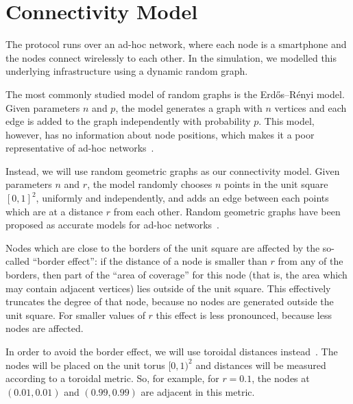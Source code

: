 \section{Connectivity Model}

The protocol runs over an ad-hoc network,
where each node is a smartphone
and the nodes connect wirelessly to each other.
In the simulation,
we modelled this underlying infrastructure using a dynamic random graph.

The most commonly studied model of random graphs is the Erdős--Rényi model.
Given parameters $n$ and $p$,
the model generates a graph with $n$ vertices
and each edge is added to the graph independently with probability $p$.
This model, however,
has no information about node positions,
which makes it a poor representative of ad-hoc networks~\cite{Hekmat2006}.

Instead,
we will use random geometric graphs as our connectivity model.
Given parameters $n$ and $r$,
the model randomly chooses $n$ points in the unit square $[0, 1]^2$,
uniformly and independently,
and adds an edge between each points which are at a distance $r$ from each other.
Random geometric graphs
have been proposed as accurate models for ad-hoc networks~\cite{Kenniche2010,Hekmat2006}.

Nodes which are close to the borders of the unit square
are affected by the so-called ``border effect'':
if the distance of a node is smaller than $r$
from any of the borders,
then part of the ``area of coverage'' for this node
(that is,
the area which may contain adjacent vertices)
lies outside of the unit square.
This effectively truncates the degree of that node,
because no nodes are generated outside the unit square.
For smaller values of $r$ this effect is less pronounced,
because less nodes are affected.

In order to avoid the border effect,
we will use toroidal distances instead~\cite{Kenniche2010,Hekmat2006}.
The nodes will be placed on the unit torus $[0, 1)^2$
and distances will be measured according to a toroidal metric.
So,
for example,
for $r = 0.1$,
the nodes at $(0.01, 0.01)$ and $(0.99, 0.99)$ are adjacent in this metric.
